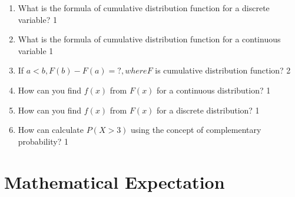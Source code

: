 \documentclass[a4paper,oneside, margin=1.4in]{book}
\begin{document}
\begin{enumerate}
\item What is the formula of cumulative distribution function for a discrete variable? \hfill 1

\item What is the formula of cumulative distribution function for a continuous variable \hfill 1

\item If $a<b, F(b) - F(a) = ?, where F$ is cumulative distribution function? \hfill 2

\item How can you find $f(x)$ from $F(x)$ for a continuous distribution? \hfill 1

\item How can you find $f(x)$ from $F(x)$ for a discrete distribution? \hfill 1

  \item How can calculate $P(X>3)$ using the concept of complementary probability?  \hfill 1




  \end{enumerate}

\chapter{Mathematical Expectation} 
\end{document}
